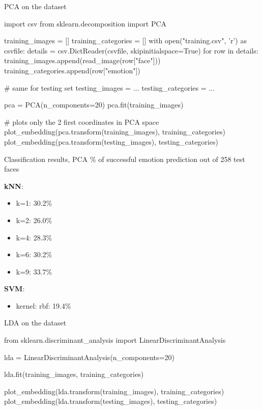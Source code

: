 \documentclass[compress]{beamer}
\begin{document}
\begin{frame}[fragile]{PCA on the dataset}
    \begin{pythoncode}
import csv
from sklearn.decomposition import PCA

training_images = []
training_categories = []
with open("training.csv", 'r') as csvfile:
    details = csv.DictReader(csvfile, skipinitialspace=True)
    for row in details:
        training_images.append(read_image(row["face"]))
        training_categories.append(row["emotion"])

# same for testing set
testing_images = ...
testing_categories = ...

pca = PCA(n_components=20)
pca.fit(training_images)

# plots only the 2 first coordinates in PCA space
plot_embedding(pca.transform(training_images), training_categories)
plot_embedding(pca.transform(testing_images), testing_categories)

\end{pythoncode}
\end{frame}

\begin{frame}{Classification results, PCA}
    \% of successful emotion prediction out of 258 test faces

    {\bf kNN}:
    \begin{itemize}
        \item k=1: 30.2\%
        \item k=2: 26.0\%
        \item k=4: 28.3\%
        \item k=6: 30.2\%
        \item k=9: 33.7\%
    \end{itemize}

    {\bf SVM}:

    \begin{itemize}
            \item kernel: rbf: 19.4\%
    \end{itemize}
\end{frame}

\begin{frame}[fragile]{LDA on the dataset}
    \begin{pythoncode}
from sklearn.discriminant_analysis import LinearDiscriminantAnalysis

lda = LinearDiscriminantAnalysis(n_components=20)

lda.fit(training_images, training_categories)

plot_embedding(lda.transform(training_images), training_categories)
plot_embedding(lda.transform(testing_images), testing_categories)
\end{pythoncode}
\end{frame}
\end{document}

